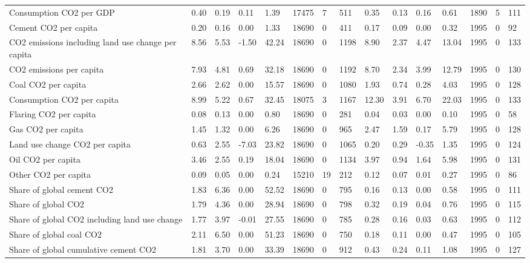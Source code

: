 \begin{longtable}{lllllllllllllll}
\addlinespace
Consumption CO2 per GDP & 0.40 & 0.19 & 0.11 & 1.39 & 17475 & 7 & 511 & 0.35 & 0.13 & 0.16 & 0.61 & 1890 & 5 & 111\\
Cement CO2 per capita & 0.20 & 0.16 & 0.00 & 1.33 & 18690 & 0 & 411 & 0.17 & 0.09 & 0.00 & 0.32 & 1995 & 0 & 92\\
CO2 emissions including land use change per capita & 8.56 & 5.53 & -1.50 & 42.24 & 18690 & 0 & 1198 & 8.90 & 2.37 & 4.47 & 13.04 & 1995 & 0 & 133\\
CO2 emissions per capita & 7.93 & 4.81 & 0.69 & 32.18 & 18690 & 0 & 1192 & 8.70 & 2.34 & 3.99 & 12.79 & 1995 & 0 & 130\\
Coal CO2 per capita & 2.66 & 2.62 & 0.00 & 15.57 & 18690 & 0 & 1080 & 1.93 & 0.74 & 0.28 & 4.03 & 1995 & 0 & 128\\
\addlinespace
Consumption CO2 per capita & 8.99 & 5.22 & 0.67 & 32.45 & 18075 & 3 & 1167 & 12.30 & 3.91 & 6.70 & 22.03 & 1995 & 0 & 133\\
Flaring CO2 per capita & 0.08 & 0.13 & 0.00 & 0.80 & 18690 & 0 & 281 & 0.04 & 0.03 & 0.00 & 0.10 & 1995 & 0 & 58\\
Gas CO2 per capita & 1.45 & 1.32 & 0.00 & 6.26 & 18690 & 0 & 965 & 2.47 & 1.59 & 0.17 & 5.79 & 1995 & 0 & 128\\
Land use change CO2 per capita & 0.63 & 2.55 & -7.03 & 23.82 & 18690 & 0 & 1065 & 0.20 & 0.29 & -0.35 & 1.35 & 1995 & 0 & 124\\
Oil CO2 per capita & 3.46 & 2.55 & 0.19 & 18.04 & 18690 & 0 & 1134 & 3.97 & 0.94 & 1.64 & 5.98 & 1995 & 0 & 131\\
\addlinespace
Other CO2 per capita & 0.09 & 0.05 & 0.00 & 0.24 & 15210 & 19 & 212 & 0.12 & 0.07 & 0.01 & 0.27 & 1995 & 0 & 86\\
Share of global cement CO2 & 1.83 & 6.36 & 0.00 & 52.52 & 18690 & 0 & 795 & 0.16 & 0.13 & 0.00 & 0.58 & 1995 & 0 & 111\\
Share of global CO2 & 1.79 & 4.36 & 0.00 & 28.94 & 18690 & 0 & 798 & 0.32 & 0.19 & 0.04 & 0.76 & 1995 & 0 & 115\\
Share of global CO2 including land use change & 1.77 & 3.97 & -0.01 & 27.55 & 18690 & 0 & 785 & 0.28 & 0.16 & 0.03 & 0.63 & 1995 & 0 & 112\\
Share of global coal CO2 & 2.11 & 6.50 & 0.00 & 51.23 & 18690 & 0 & 750 & 0.18 & 0.11 & 0.00 & 0.47 & 1995 & 0 & 105\\
\addlinespace
Share of global cumulative cement CO2 & 1.81 & 3.70 & 0.00 & 33.39 & 18690 & 0 & 912 & 0.43 & 0.24 & 0.11 & 1.08 & 1995 & 0 & 127\\

\end{longtable}
